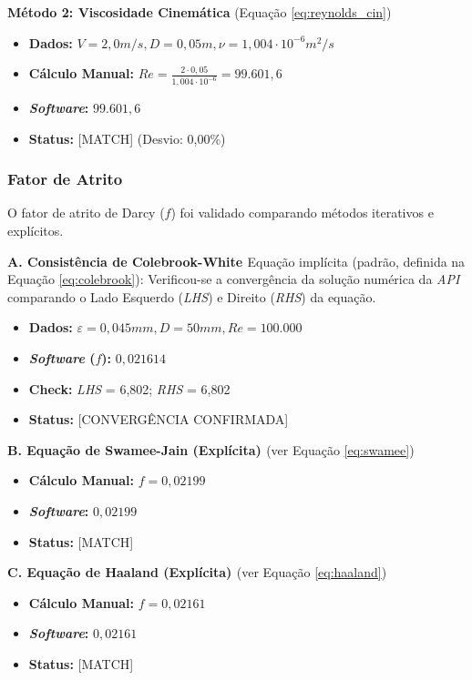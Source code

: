 \textbf{Método 2: Viscosidade Cinemática}
(Equação \ref{eq:reynolds_cin})
\begin{itemize}
    \item \textbf{Dados:} $V=2,0 m/s, D=0,05 m, \nu=1,004 \cdot 10^{-6} m^2/s$
    \item \textbf{Cálculo Manual:} $Re = \frac{2 \cdot 0,05}{1,004 \cdot 10^{-6}} = 99.601,6$
    \item \textbf{\textit{Software}:} $99.601,6$
    \item \textbf{Status:} [MATCH] (Desvio: 0,00\%)
\end{itemize}

\subsubsection{Fator de Atrito}
O fator de atrito de Darcy ($f$) foi validado comparando métodos iterativos e explícitos.

\textbf{A. Consistência de Colebrook-White \cite{colebrook1939}}
Equação implícita (padrão, definida na Equação \ref{eq:colebrook}):
Verificou-se a convergência da solução numérica da \textit{API} comparando o Lado Esquerdo (\textit{LHS}) e Direito (\textit{RHS}) da equação.
\begin{itemize}
    \item \textbf{Dados:} $\varepsilon=0,045mm, D=50mm, Re=100.000$
    \item \textbf{\textit{Software} ($f$):} $0,021614$
    \item \textbf{Check:} \textit{LHS} = 6,802; \textit{RHS} = 6,802
    \item \textbf{Status:} [CONVERGÊNCIA CONFIRMADA]
\end{itemize}

\textbf{B. Equação de Swamee-Jain (Explícita) \cite{swamee1976}}
(ver Equação \ref{eq:swamee})
\begin{itemize}
    \item \textbf{Cálculo Manual:} $f = 0,02199$
    \item \textbf{\textit{Software}:} $0,02199$
    \item \textbf{Status:} [MATCH]
\end{itemize}

\textbf{C. Equação de Haaland (Explícita) \cite{haaland1983}}
(ver Equação \ref{eq:haaland})
\begin{itemize}
    \item \textbf{Cálculo Manual:} $f = 0,02161$
    \item \textbf{\textit{Software}:} $0,02161$
    \item \textbf{Status:} [MATCH]
\end{itemize}

